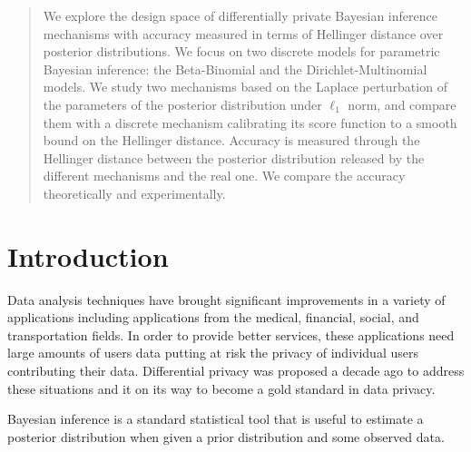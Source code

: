 \documentclass{article}
\begin{document}
\begin{abstract}
We explore the design space of differentially private Bayesian
inference mechanisms with accuracy measured in terms of Hellinger
distance over posterior distributions.  
We focus on two discrete models for parametric Bayesian
inference: the Beta-Binomial and the Dirichlet-Multinomial
models. We study two mechanisms based on the 
Laplace perturbation of the parameters of the posterior distribution under
$\ell_1$ norm, and compare them with a discrete mechanism calibrating 
its score function to a smooth bound on the Hellinger distance.
Accuracy is measured through the Hellinger distance between the posterior
distribution released by the different mechanisms and the real one.
We compare the accuracy theoretically and experimentally.
\end{abstract}





\section{Introduction}
\label{sec_intro}
Data analysis techniques have brought significant improvements in a
variety of applications including applications from the medical,
financial, social, and transportation fields. In order to provide
better services, these applications need large amounts of users data
putting at risk the privacy of individual users contributing their data. 
Differential privacy was proposed a decade ago to address these
situations and it on its way to become a gold standard in data
privacy.  

Bayesian inference is a standard statistical tool that is useful to
estimate a posterior distribution when given a prior distribution and
some observed data. 
\end{document}
